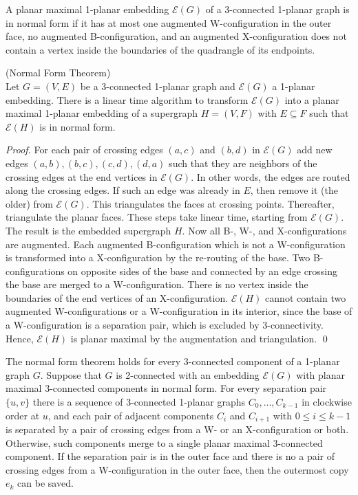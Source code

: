 \documentclass[runningheads]{llncs}
\begin{document}
\begin{definition}
A planar maximal 1-planar embedding $\mathcal{E}(G)$ of a
3-connected 1-planar graph is in \textrm{normal form} if it has at
most one augmented W-configuration in the outer face, no augmented
B-configuration, and an augmented X-configuration does not contain a
vertex inside   the boundaries of the quadrangle of its endpoints.
\end{definition}



\begin{proposition} (Normal Form Theorem) \cite{abk-sld3c-13} \\
Let $G = (V,E)$ be a 3-connected 1-planar graph and $\mathcal{E}(G)$
a 1-planar embedding. There is a linear time algorithm to  transform
 $\mathcal{E}(G)$ into a planar maximal 1-planar embedding of a supergraph
 $H = (V, F)$ with $E \subseteq F$ such that
$\mathcal{E}(H)$ is in normal form.
\end{proposition}
\begin{proof}
For each pair of crossing edges $(a,c)$ and $(b,d)$ in
 $\mathcal{E}(G)$ add new edges $(a,b), (b,c), (c,d), (d,a)$
such that they are neighbors of the crossing edges at the end
vertices in  $\mathcal{E}(G)$. In other words, the edges are routed
along the crossing edges. If such an edge was already in $E$, then
remove it (the older) from $\mathcal{E}(G)$. This triangulates the
faces at crossing points. Thereafter, triangulate the planar faces.
These steps take  linear time, starting from $\mathcal{E}(G)$. The
result is the embedded supergraph $H$. Now all B-, W-, and
X-configurations are augmented. Each augmented B-configuration which
is not a W-configuration is transformed into a X-configuration by
the re-routing of the base. Two B-configurations on opposite sides
of the base and connected by an edge crossing the base are merged to
a W-configuration. There is no vertex inside the boundaries of the
end vertices of an X-configuration. $\mathcal{E}(H)$ cannot contain
two augmented W-configurations or a W-configuration in its interior,
since the base of a W-configuration is a separation pair, which is
excluded by 3-connectivity. Hence, $\mathcal{E}(H)$ is planar
maximal by the augmentation and triangulation.
 \qed
\end{proof}

The normal form theorem holds for every 3-connected component of a
1-planar graph $G$. Suppose that  $G$ is 2-connected with an
embedding $\mathcal{E}(G)$ with planar maximal 3-connected
components in normal form. For every separation pair $\{ u,v \}$
there is a sequence of 3-connected 1-planar graphs $C_0,\ldots,
C_{k-1}$ in clockwise order at $u$, and each pair of adjacent
components $C_i$ and $C_{i+1}$ with $0 \leq i \leq k-1$ is separated
by a pair of crossing edges from a W- or an X-configuration or both.
Otherwise, such components merge to a single planar maximal
3-connected component. If the separation pair is in the outer face
and there is no a pair of crossing edges from a W-configuration in
the outer face, then the outermost copy $e_k$ can be saved.
\end{document}
